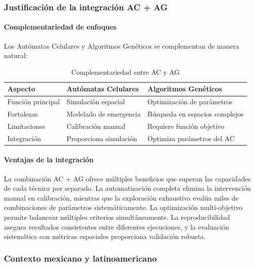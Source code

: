 \subsubsection{Justificación de la integración AC + AG}

\paragraph{Complementariedad de enfoques}

Los Autómatas Celulares y Algoritmos Genéticos se complementan de manera natural:

\begin{table}[h]
\centering
\caption{Complementariedad entre AC y AG}
\renewcommand{\arraystretch}{1.3}
\begin{tabular}{@{}lll@{}}
\toprule
\textbf{Aspecto} & \textbf{Autómatas Celulares} & \textbf{Algoritmos Genéticos} \\
\midrule
Función principal & Simulación espacial & Optimización de parámetros \\
Fortalezas & Modelado de emergencia & Búsqueda en espacios complejos \\
Limitaciones & Calibración manual & Requiere función objetivo \\
Integración & Proporciona simulación & Optimiza parámetros del AC \\
\bottomrule
\end{tabular}
\label{tab:ac_ag_complementarity}
\end{table}

\paragraph{Ventajas de la integración}

La combinación AC + AG ofrece múltiples beneficios que superan las capacidades de cada técnica por separado. La automatización completa elimina la intervención manual en calibración, mientras que la exploración exhaustiva evalúa miles de combinaciones de parámetros sistemáticamente. La optimización multi-objetivo permite balancear múltiples criterios simultáneamente. La reproducibilidad asegura resultados consistentes entre diferentes ejecuciones, y la evaluación sistemática con métricas espaciales proporciona validación robusta.

\subsubsection{Contexto mexicano y latinoamericano}

